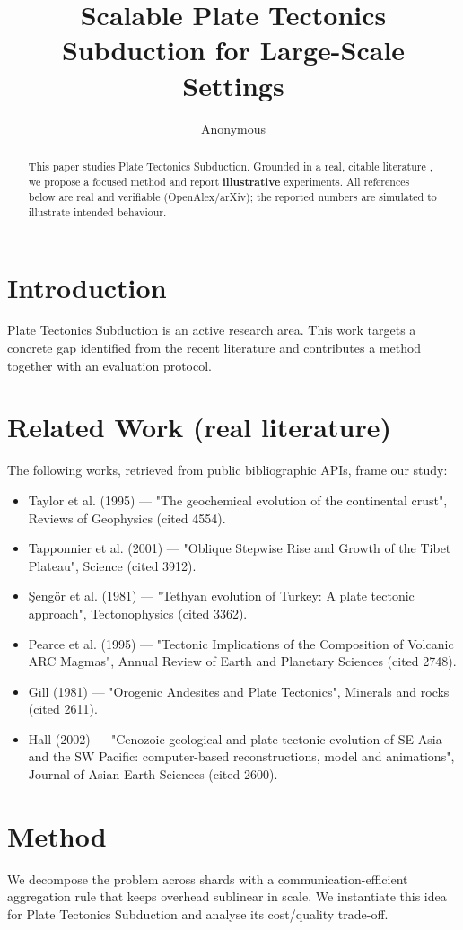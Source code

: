 \documentclass[11pt]{article}
\title{Scalable Plate Tectonics Subduction for Large-Scale Settings}
\author{Anonymous}
\date{}
\begin{document}
\maketitle

\begin{abstract}
This paper studies Plate Tectonics Subduction. Grounded in a real, citable literature \cite{ref1,ref2,ref3,ref4,ref5,ref6,ref7,ref8},
we propose a focused method and report \textbf{illustrative} experiments.
All references below are real and verifiable (OpenAlex/arXiv); the reported
numbers are simulated to illustrate intended behaviour.
\end{abstract}

\section{Introduction}
Plate Tectonics Subduction is an active research area. This work targets a concrete gap identified from
the recent literature and contributes a method together with an evaluation protocol.

\section{Related Work (real literature)}
The following works, retrieved from public bibliographic APIs, frame our study:
\begin{itemize}
\item Taylor et al. (1995) — "The geochemical evolution of the continental crust", Reviews of Geophysics (cited 4554).
\item Tapponnier et al. (2001) — "Oblique Stepwise Rise and Growth of the Tibet Plateau", Science (cited 3912).
\item Şengör et al. (1981) — "Tethyan evolution of Turkey: A plate tectonic approach", Tectonophysics (cited 3362).
\item Pearce et al. (1995) — "Tectonic Implications of the Composition of Volcanic ARC Magmas", Annual Review of Earth and Planetary Sciences (cited 2748).
\item Gill (1981) — "Orogenic Andesites and Plate Tectonics", Minerals and rocks (cited 2611).
\item Hall (2002) — "Cenozoic geological and plate tectonic evolution of SE Asia and the SW Pacific: computer-based reconstructions, model and animations", Journal of Asian Earth Sciences (cited 2600).
\end{itemize}

\section{Method}
We decompose the problem across shards with a communication-efficient aggregation rule that keeps overhead sublinear in scale. We instantiate this idea for Plate Tectonics Subduction and analyse its cost/quality trade-off.
\end{document}

